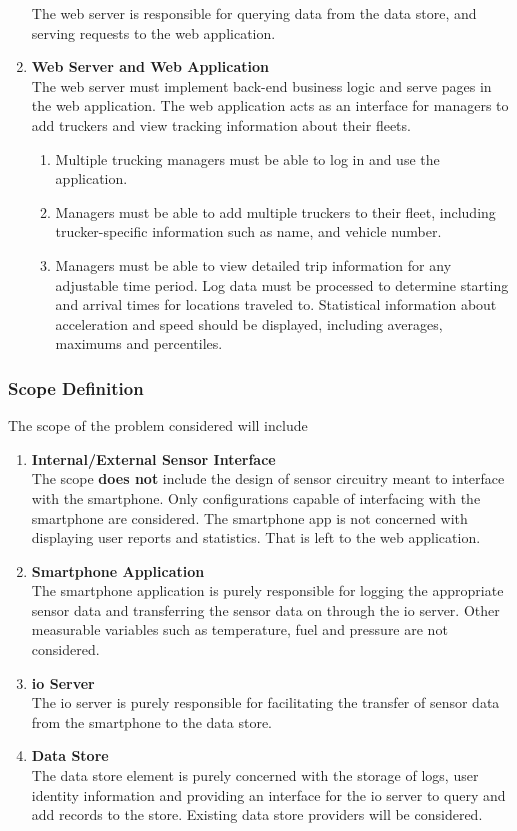 \begin{enumerate}
The web server is responsible for querying data from the data store, and serving requests to the web application.
\item \textbf{Web Server and Web Application}\\
The web server must implement back-end business logic and serve pages in the web application.
The web application acts as an interface for managers to add truckers and view tracking information about their fleets.
    \begin{enumerate}
        \item Multiple trucking managers must be able to log in and use the application.
        \item Managers must be able to add multiple truckers to their fleet, including trucker-specific information such as name, and vehicle number.
        \item Managers must be able to view detailed trip information for any adjustable time period. Log data must be processed to determine starting and arrival times for locations traveled to. Statistical information about acceleration and speed should be displayed, including averages, maximums and percentiles.
    \end{enumerate}
\end{enumerate}
\subsubsection{Scope Definition}
The scope of the problem considered will include
\begin{enumerate}
\item \textbf{Internal/External Sensor Interface}\\
The scope \textbf{does not} include the design of sensor circuitry meant to interface with the smartphone. Only configurations capable of interfacing with the smartphone are considered.
The smartphone app is not concerned with displaying user reports and statistics. That is left to the web application.
\item \textbf{Smartphone Application}\\
The smartphone application is purely responsible for logging the appropriate sensor data and transferring the sensor data on through the \ac{io} server.
Other measurable variables such as temperature, fuel and pressure are not considered.
\item \textbf{\ac{io} Server}\\
The \ac{io} server is purely responsible for facilitating the transfer of sensor data from the smartphone to the data store.
\item \textbf{Data Store}\\
    The data store element is purely concerned with the storage of logs, user identity information and providing an interface for the \ac{io} server to query and add records to the store.
    Existing data store providers will be considered.
\end{enumerate}

